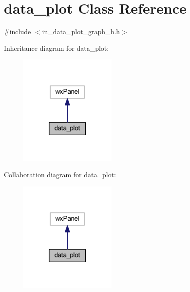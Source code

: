 \section{data\+\_\+plot Class Reference}
\label{classdata__plot}


{\ttfamily \#include $<$in\+\_\+data\+\_\+plot\+\_\+graph\+\_\+h.\+h$>$}



Inheritance diagram for data\+\_\+plot\+:
\nopagebreak
\begin{figure}[H]
\begin{center}
\leavevmode
\includegraphics[width=136pt]{classdata__plot__inherit__graph}
\end{center}
\end{figure}


Collaboration diagram for data\+\_\+plot\+:
\nopagebreak
\begin{figure}[H]
\begin{center}
\leavevmode
\includegraphics[width=136pt]{classdata__plot__coll__graph}
\end{center}
\end{figure}
